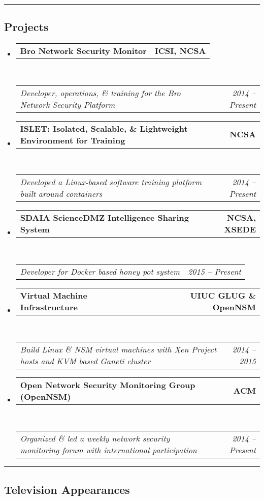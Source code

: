 \documentclass[10pt,letterpaper]{article}
\makeatletter
\newcommand{\headerrow}[2]
{\begin{tabular*}{\linewidth}{l@{\extracolsep{\fill}}r}
	#1 &
	#2 \\
\end{tabular*}}
\makeatother
\begin{document}
\hrule
\vspace{-0.4em}
\subsection*{Projects}

\begin{itemize}
	\parskip=0.1em

	\item
	\headerrow
		{\textbf{Bro Network Security Monitor}}
		{\textbf{ICSI, NCSA}}
	\\
	\headerrow
		{\emph{Developer, operations, \& training for the Bro Network Security Platform}}
		{\emph{2014 -- Present}}

	\item
	\headerrow
		{\textbf{ISLET: Isolated, Scalable, \& Lightweight Environment for Training}}
		{\textbf{NCSA}}
	\\
	\headerrow
		{\emph{Developed a Linux-based software training platform built around containers}}
		{\emph{2014 -- Present}}

	\item
	\headerrow
		{\textbf{SDAIA ScienceDMZ Intelligence Sharing System}}
		{\textbf{NCSA, XSEDE}}
	\\
	\headerrow
		{\emph{Developer for Docker based honey pot system}}
		{\emph{2015 -- Present}}

	\item
	\headerrow
		{\textbf{Virtual Machine Infrastructure}}
		{\textbf{UIUC GLUG \& OpenNSM}}
	\\
	\headerrow
		{\emph{Build Linux \& NSM virtual machines with Xen Project hosts and KVM based Ganeti cluster}}
		{\emph{2014 -- 2015}}

	\item
	\headerrow
		{\textbf{Open Network Security Monitoring Group (OpenNSM)}}
		{\textbf{ACM}}
	\\
	\headerrow
		{\emph{Organized \& led a weekly network security monitoring forum with international participation}}
		{\emph{2014 -- Present}}

\end{itemize}




\hrule
\vspace{-0.4em}
\subsection*{Television Appearances}
\end{document}
